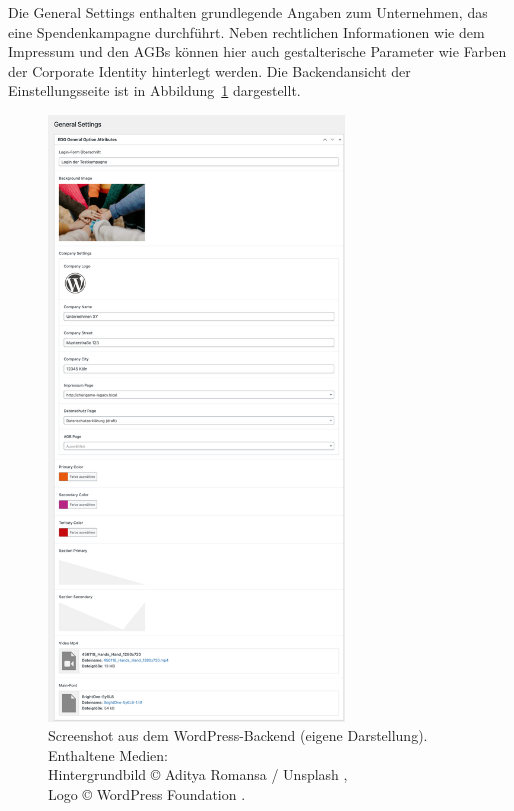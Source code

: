 Die General Settings enthalten grundlegende Angaben zum Unternehmen, das eine Spendenkampagne durchführt.
Neben rechtlichen Informationen wie dem Impressum und den AGBs können hier auch gestalterische Parameter wie Farben der Corporate Identity hinterlegt werden.
Die Backendansicht der Einstellungsseite ist in Abbildung~\ref{fig:charigame-general-settings-legacy} dargestellt.
\begin{figure}[H]
    \centering
    \includegraphics[width=0.7\textwidth]{images/legacy_general_settings}
    \caption{Screenshot aus dem WordPress-Backend (eigene Darstellung).\\
    Enthaltene Medien:\\Hintergrundbild © Aditya Romansa / Unsplash \cite{unsplash_romansa_babyhand},\\
    Logo © WordPress Foundation \cite{wordpresslogo}.}
    \label{fig:charigame-general-settings-legacy}
\end{figure}

